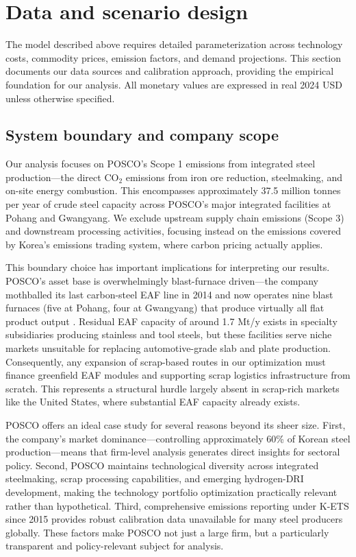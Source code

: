 \section{Data and scenario design}

The model described above requires detailed parameterization across technology costs, commodity prices, emission factors, and demand projections. This section documents our data sources and calibration approach, providing the empirical foundation for our analysis. All monetary values are expressed in real 2024 USD unless otherwise specified.

\subsection{System boundary and company scope}

Our analysis focuses on POSCO's Scope 1 emissions from integrated steel production—the direct CO$_2$ emissions from iron ore reduction, steelmaking, and on-site energy combustion. This encompasses approximately 37.5 million tonnes per year of crude steel capacity across POSCO's major integrated facilities at Pohang and Gwangyang. We exclude upstream supply chain emissions (Scope 3) and downstream processing activities, focusing instead on the emissions covered by Korea's emissions trading system, where carbon pricing actually applies.

This boundary choice has important implications for interpreting our results. POSCO's asset base is overwhelmingly blast-furnace driven—the company mothballed its last carbon-steel EAF line in 2014 and now operates nine blast furnaces (five at Pohang, four at Gwangyang) that produce virtually all flat product output \citep{POSCO2023SR,KOSA2024Yearbook}. Residual EAF capacity of around 1.7 Mt/y exists in specialty subsidiaries producing stainless and tool steels, but these facilities serve niche markets unsuitable for replacing automotive-grade slab and plate production. Consequently, any expansion of scrap-based routes in our optimization must finance greenfield EAF modules and supporting scrap logistics infrastructure from scratch. This represents a structural hurdle largely absent in scrap-rich markets like the United States, where substantial EAF capacity already exists.

POSCO offers an ideal case study for several reasons beyond its sheer size. First, the company's market dominance—controlling approximately 60\% of Korean steel production—means that firm-level analysis generates direct insights for sectoral policy. Second, POSCO maintains technological diversity across integrated steelmaking, scrap processing capabilities, and emerging hydrogen-DRI development, making the technology portfolio optimization practically relevant rather than hypothetical. Third, comprehensive emissions reporting under K-ETS since 2015 provides robust calibration data unavailable for many steel producers globally. These factors make POSCO not just a large firm, but a particularly transparent and policy-relevant subject for analysis.

